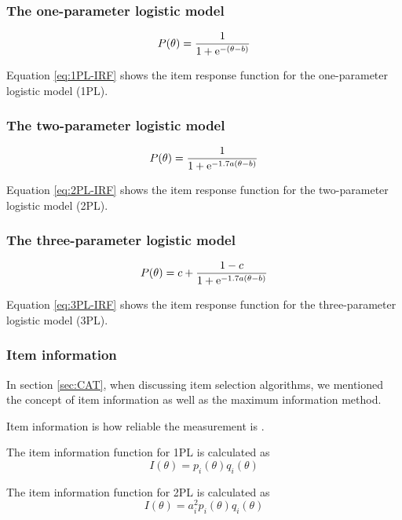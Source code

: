 \subsubsection{The one-parameter logistic model}
\begin{equation} \label{eq:1PL-IRF}
P(\theta) = \frac{1}{1 + \mathrm{e}^{-(\theta - b)}}
\end{equation}

Equation \eqref{eq:1PL-IRF} shows the item response function for the one-parameter logistic model (1PL). 

\subsubsection{The two-parameter logistic model}
\begin{equation} \label{eq:2PL-IRF}
P(\theta) = \frac{1}{1 + \mathrm{e}^{-1.7a(\theta - b)}}
\end{equation}

Equation \eqref{eq:2PL-IRF} shows the item response function for the two-parameter logistic model (2PL). 

\subsubsection{The three-parameter logistic model}
\begin{equation} \label{eq:3PL-IRF}
P(\theta) = c + \frac{1 - c}{1 + \mathrm{e}^{-1.7a(\theta - b)}}
\end{equation}

Equation \eqref{eq:3PL-IRF} shows the item response function for the three-parameter logistic model (3PL).

\subsubsection{Item information}
In section \ref{sec:CAT}, when discussing item selection algorithms, we mentioned the concept of item information as well as the maximum information method. \newline

Item information is how reliable the measurement is \cite{Basics-IRT}. \newline


The item information function for 1PL is calculated as
$$I(\theta) = p_i(\theta)q_i(\theta)$$

The item information function for 2PL is calculated as
$$I(\theta) = a_i^2 p_i(\theta)q_i(\theta)$$

